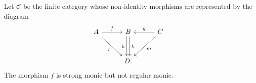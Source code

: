 Let $\mathcal{C}$ be the finite category whose non-identity morphisms are represented
by the diagram
\[\begin{tikzcd}[row sep=1cm, column sep=1cm]
	A\ar[r, "f"]\ar[dr, "l" below left] & B\ar[d, shift left, "k"]\ar[d, shift right, "h" left] & C\ar[l, "g" above]\ar[dl, "m"]\\
	& D.
\end{tikzcd}\]
The morphism $f$ is strong monic but not regular monic.
